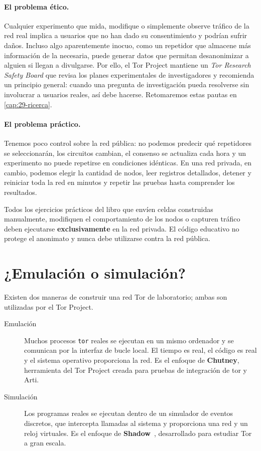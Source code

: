\paragraph{El problema ético.} Cualquier experimento que mida, modifique o simplemente observe tráfico de la red real implica a usuarios que no han dado su consentimiento y podrían sufrir daños. Incluso algo aparentemente inocuo, como un repetidor que almacene más información de la necesaria, puede generar datos que permitan desanonimizar a alguien si llegan a divulgarse. Por ello, el Tor Project mantiene un \emph{Tor Research Safety Board} que revisa los planes experimentales de investigadores y recomienda un principio general: cuando una pregunta de investigación pueda resolverse sin involucrar a usuarios reales, así debe hacerse. Retomaremos estas pautas en \cref{cap:29-ricerca}.

\paragraph{El problema práctico.} Tenemos poco control sobre la red pública: no podemos predecir qué repetidores se seleccionarán, los circuitos cambian, el consenso se actualiza cada hora y un experimento no puede repetirse en condiciones idénticas. En una red privada, en cambio, podemos elegir la cantidad de nodos, leer registros detallados, detener y reiniciar toda la red en minutos y repetir las pruebas hasta comprender los resultados.

\begin{attenzione}
Todos los ejercicios prácticos del libro que envíen celdas construidas manualmente, modifiquen el comportamiento de los nodos o capturen tráfico deben ejecutarse \textbf{exclusivamente} en la red privada. El código educativo  no protege el anonimato y nunca debe utilizarse contra la red pública.
\end{attenzione}

\section{¿Emulación o simulación?}\label{sec:rp-strumenti}

Existen dos maneras de construir una red Tor de laboratorio; ambas son utilizadas por el Tor Project.

\begin{description}
  \item[Emulación] Muchos procesos \texttt{tor} reales se ejecutan en un mismo ordenador y se comunican por la interfaz de bucle local. El tiempo es real, el código es real y el sistema operativo proporciona la red. Es el enfoque de \textbf{Chutney}, herramienta del Tor Project creada para pruebas de integración de tor y Arti.
  \item[Simulación] Los programas reales se ejecutan dentro de un simulador de eventos discretos, que intercepta llamadas al sistema y proporciona una red y un reloj virtuales. Es el enfoque de \textbf{Shadow}~\cite{jansen2012shadow}, desarrollado para estudiar Tor a gran escala.
\end{description}

